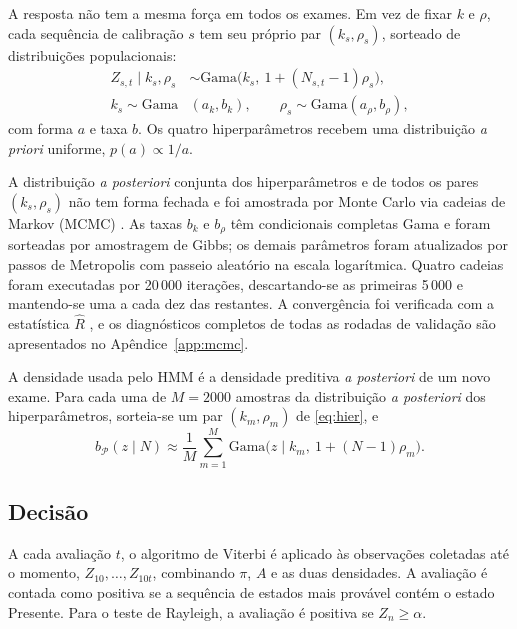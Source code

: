 \documentclass[conference]{IEEEtran}
\begin{document}
A resposta não tem a mesma força em todos os exames. Em vez de fixar $k$ e $\rho$, cada sequência de calibração $s$ tem seu próprio par $(k_s,\rho_s)$, sorteado de distribuições populacionais:
\begin{equation}
\begin{aligned}
Z_{s,t}\mid k_s,\rho_s &\sim \mathrm{Gama}\big(k_s,\ 1+(N_{s,t}-1)\rho_s\big),\\
k_s \sim \mathrm{Gama}&(a_k,b_k),\qquad \rho_s \sim \mathrm{Gama}(a_\rho,b_\rho),
\end{aligned}
\label{eq:hier}
\end{equation}
com forma $a$ e taxa $b$. Os quatro hiperparâmetros recebem uma distribuição \textit{a priori} uniforme, $p(a)\propto 1/a$.

A distribuição \textit{a posteriori} conjunta dos hiperparâmetros e de todos os pares $(k_s,\rho_s)$ não tem forma fechada e foi amostrada por Monte Carlo via cadeias de Markov (MCMC) \cite{gelman2013}. As taxas $b_k$ e $b_\rho$ têm condicionais completas Gama e foram sorteadas por amostragem de Gibbs; os demais parâmetros foram atualizados por passos de Metropolis com passeio aleatório na escala logarítmica. Quatro cadeias foram executadas por 20\,000 iterações, descartando-se as primeiras 5\,000 e mantendo-se uma a cada dez das restantes. A convergência foi verificada com a estatística $\hat{R}$ \cite{gelman1992}, e os diagnósticos completos de todas as rodadas de validação são apresentados no Apêndice~\ref{app:mcmc}.

A densidade usada pelo HMM é a densidade preditiva \textit{a posteriori} de um novo exame. Para cada uma de $M=2000$ amostras da distribuição \textit{a posteriori} dos hiperparâmetros, sorteia-se um par $(k_m,\rho_m)$ de \eqref{eq:hier}, e
\begin{equation}
b_{\mathcal{P}}(z\mid N)\approx\frac{1}{M}\sum_{m=1}^{M}\mathrm{Gama}\big(z\mid k_m,\ 1+(N-1)\rho_m\big).
\label{eq:pred}
\end{equation}


\subsection{Decisão}

A cada avaliação $t$, o algoritmo de Viterbi é aplicado às observações coletadas até o momento, $Z_{10},\ldots,Z_{10t}$, combinando $\pi$, $A$ e as duas densidades. A avaliação é contada como positiva se a sequência de estados mais provável contém o estado Presente. Para o teste de Rayleigh, a avaliação é positiva se $Z_n\ge\alpha$.
\end{document}
